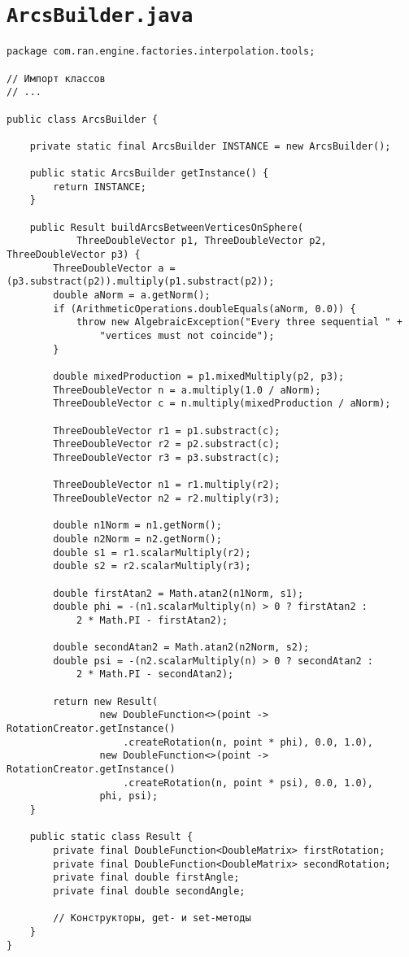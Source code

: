 \section*{\texttt{ArcsBuilder.java}}
\begin{verbatim}
package com.ran.engine.factories.interpolation.tools;

// Импорт классов
// ...

public class ArcsBuilder {

    private static final ArcsBuilder INSTANCE = new ArcsBuilder();

    public static ArcsBuilder getInstance() {
        return INSTANCE;
    }

    public Result buildArcsBetweenVerticesOnSphere(
            ThreeDoubleVector p1, ThreeDoubleVector p2, ThreeDoubleVector p3) {
        ThreeDoubleVector a = (p3.substract(p2)).multiply(p1.substract(p2));
        double aNorm = a.getNorm();
        if (ArithmeticOperations.doubleEquals(aNorm, 0.0)) {
            throw new AlgebraicException("Every three sequential " +
                "vertices must not coincide");
        }

        double mixedProduction = p1.mixedMultiply(p2, p3);
        ThreeDoubleVector n = a.multiply(1.0 / aNorm);
        ThreeDoubleVector c = n.multiply(mixedProduction / aNorm);

        ThreeDoubleVector r1 = p1.substract(c);
        ThreeDoubleVector r2 = p2.substract(c);
        ThreeDoubleVector r3 = p3.substract(c);

        ThreeDoubleVector n1 = r1.multiply(r2);
        ThreeDoubleVector n2 = r2.multiply(r3);

        double n1Norm = n1.getNorm();
        double n2Norm = n2.getNorm();
        double s1 = r1.scalarMultiply(r2);
        double s2 = r2.scalarMultiply(r3);

        double firstAtan2 = Math.atan2(n1Norm, s1);
        double phi = -(n1.scalarMultiply(n) > 0 ? firstAtan2 :
            2 * Math.PI - firstAtan2);

        double secondAtan2 = Math.atan2(n2Norm, s2);
        double psi = -(n2.scalarMultiply(n) > 0 ? secondAtan2 :
            2 * Math.PI - secondAtan2);

        return new Result(
                new DoubleFunction<>(point -> RotationCreator.getInstance()
                    .createRotation(n, point * phi), 0.0, 1.0),
                new DoubleFunction<>(point -> RotationCreator.getInstance()
                    .createRotation(n, point * psi), 0.0, 1.0),
                phi, psi);
    }

    public static class Result {
        private final DoubleFunction<DoubleMatrix> firstRotation;
        private final DoubleFunction<DoubleMatrix> secondRotation;
        private final double firstAngle;
        private final double secondAngle;

        // Конструкторы, get- и set-методы
    }
}
\end{verbatim}

